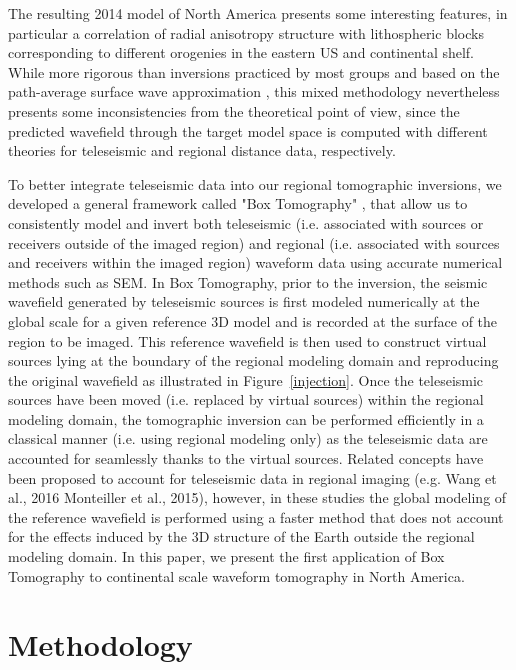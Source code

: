 \documentclass[12pt]{article}
\begin{document}
The resulting 2014 model of North America presents some interesting features, in particular a correlation of radial anisotropy structure with lithospheric blocks corresponding to different orogenies in the eastern US and continental shelf. 
While more rigorous than inversions practiced by most groups and based on the path-average surface wave approximation \citep[PAVA,][]{woodhouse1984mapping}, this mixed methodology nevertheless presents some inconsistencies from the theoretical point of view, since the predicted wavefield through the target model space is computed with different theories for teleseismic and regional distance data, respectively.

 To better integrate teleseismic data into our regional tomographic inversions, we developed a general framework called "Box Tomography"  \citep[see][]{masson2013numerical,masson2016box,masson2017fast}, that allow us to consistently model and invert both teleseismic (i.e. associated with sources or receivers outside of the imaged region) and regional (i.e. associated with sources and receivers within the imaged region) waveform data using accurate numerical methods such as SEM. 
 In Box Tomography, prior to the inversion, the seismic wavefield generated by teleseismic sources is first modeled numerically at the global scale for a given reference 3D model and is recorded at the surface of the region to be imaged. 
 This reference wavefield is then used to construct virtual sources lying at the boundary of the regional modeling domain and reproducing the original wavefield as illustrated in Figure~\ref{injection}. 
 Once the teleseismic sources have been moved (i.e. replaced by virtual sources) within the regional modeling domain, the tomographic inversion can be performed efficiently in a classical manner (i.e. using regional modeling only) as the teleseismic data are accounted for seamlessly thanks to the virtual sources. 
 Related concepts have been proposed to account for teleseismic data in regional imaging (e.g. Wang et al., 2016 Monteiller et al., 2015), however, in these studies the global modeling of the reference wavefield is performed using a faster method that does not account for the effects induced by the 3D structure of the Earth outside the regional modeling domain. In this paper, we present the first application of Box Tomography to continental scale waveform tomography in North America.


\section{Methodology}
\end{document}
